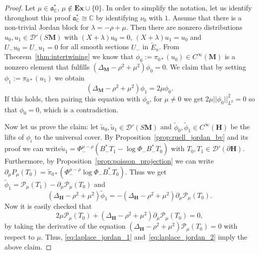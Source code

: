\documentclass[AHL, Unicode, longabstracts, published]{cedram}
\newcommand{\cc}{\mathbb{C}}
\newcommand{\bfh}{\mathbf{H}}
\newcommand{\bfm}{\mathbf{M}}
\newcommand{\pl}{\partial}
\newcommand{\til}{\widetilde}
\renewcommand{\a}{\mathfrak a}
\begin{document}
\begin{proof}
Let $\mu\in \a^*_\cc$, $\mu\notin \mathbf{Ex}\cup\{0\}$. In order to simplify the notation, let us identify throughout this proof $\a^*_\cc\cong \cc$ by identifying $\nu_0$ with $1$. Assume that there is a non-trivial Jordan block for $\lambda =-\rho+\mu$. Then there are nonzero distributions $u_0, u_1\in \mathcal D'(S{\bfm})$ with $(X +\lambda)u_0 =0$, $(X +\lambda)u_1=u_0$ and $U_- u_{0}=U_-u_1=0$ for all smooth sections $U_-$ in $\til{E}_u$. From Theorem~\ref{thm:intertwining} we know that $\phi_0:=\pi_{0*}(u_0)\in C^\infty({\bfm})$ is a nonzero element that fulfills $(\Delta_{\bfm} - \rho^2+\mu^2)\phi_0 =0$. We claim that by setting $\phi_1:= \pi_{0*}(u_1)$ we obtain
\[
\left(\Delta_{\bfm} - \rho^2+\mu^2\right)\phi_1 =2\mu\phi_0.
\]
If this holds, then pairing this equation with $\phi_0$, for $\mu\not=0$ we get $2\mu||\phi_0||_{L^2}^2=0$ so that $\phi_0=0$, which is a contradiction.

Now let us prove the claim: let $\til u_0, \til u_1\in \mathcal D'(S{\bfm})$ and $\til \phi_0, \til \phi_1 \in C^\infty ({\bfh})$ be the lifts of $\phi_i$ to the universal cover. By Proposition~\ref{prop:ruell_jordan_bv} and its proof we can write\linebreak$\til u_1 = \Phi_-^{\mu-\rho}(B_-^*T_1 - \log \Phi_- B_-^*T_0)$ with $T_0, T_1\in \mathcal D'(\pl {\bfh})$. Furthermore, by Proposition~\ref{prop:poisson_projection} we can write $\partial_\mu P_\mu(T_0) = \til \pi_{0*}(\Phi_-^{\mu-\rho}\log\Phi_- B_-^*T_0)$. Thus we get $\til \phi_1= \mathcal P_\mu (T_1) - \partial_\mu \mathcal P_\mu(T_0)$ and
\begin{equation}\label{eq:laplace_jordan_1}
\left(\Delta_{{\bfh}} - \rho^2+\mu^2\right)\til{\phi}_1 = -\left(\Delta_{{\bfh}} - \rho^2+\mu^2\right)\partial_\mu\mathcal P_\mu(T_0).
\end{equation}
Now it is easily checked that
\begin{equation}\label{eq:laplace_jordan_2}
2\mu \mathcal P_\mu(T_0) +\left(\Delta_{{\bfh}} -\rho^2+\mu^2\right)\partial_\mu\mathcal P_\mu(T_0) =0,
\end{equation}
by taking the derivative of the equation $(\Delta_{{\bfh}} -\rho^2+\mu^2)\mathcal P_\mu(T_0)=0$ with respect to $\mu$. Thus, \eqref{eq:laplace_jordan_1} and~\eqref{eq:laplace_jordan_2} imply the above claim.


\end{proof}
\end{document}

